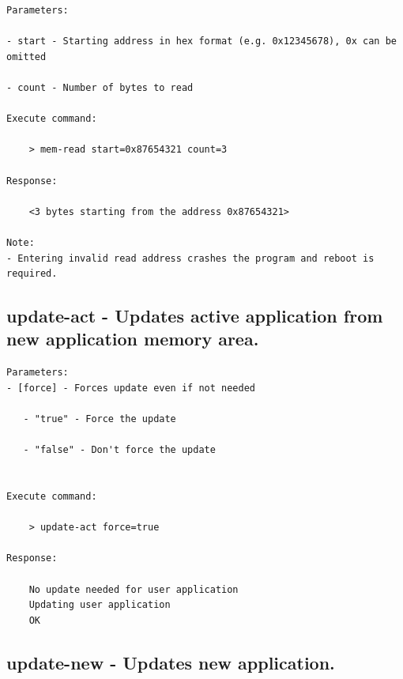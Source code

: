 \begin{lstlisting}
Parameters:

- start - Starting address in hex format (e.g. 0x12345678), 0x can be omitted
     
- count - Number of bytes to read

Execute command: 

    > mem-read start=0x87654321 count=3  
    
Response: 

    <3 bytes starting from the address 0x87654321>
    
Note:
- Entering invalid read address crashes the program and reboot is required. 
\end{lstlisting}

\subsection{update-act - Updates active application from new application memory area.}
\label{bl_cmd:update-act}

\begin{lstlisting}
Parameters:
- [force] - Forces update even if not needed

   - "true" - Force the update
                
   - "false" - Don't force the update


Execute command: 

    > update-act force=true
    
Response: 

    No update needed for user application
    Updating user application
    OK
\end{lstlisting}
    

\subsection{update-new - Updates new application.}
\label{bl_cmd:update-new}

